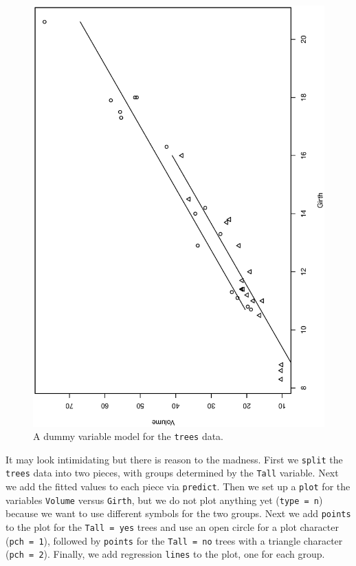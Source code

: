 \documentclass[captions=tableheading]{scrbook}
\begin{document}
\begin{figure}[th]
  \includegraphics[angle=270, totalheight=4in]{ps/mlr/dummy-variable-trees.ps}
  \caption[A dummy variable model for the \texttt{trees} data]{\small A dummy variable model for the \texttt{trees} data.}
  \label{fig-dummy-variable-trees}
\end{figure}


It may look intimidating but there is reason to the madness. First we \texttt{split} the \texttt{trees} data into two pieces, with groups determined by the \texttt{Tall} variable. Next we add the fitted values to each piece via \texttt{predict}. Then we set up a \texttt{plot} for the variables \texttt{Volume} versus \texttt{Girth}, but we do not plot anything yet (\texttt{type = n}) because we want to use different symbols for the two groups. Next we add \texttt{points} to the plot for the \texttt{Tall = yes} trees and use an open circle for a plot character (\texttt{pch = 1}), followed by \texttt{points} for the \texttt{Tall = no} trees with a triangle character (\texttt{pch = 2}). Finally, we add regression \texttt{lines} to the plot, one for each group.
\end{document}
